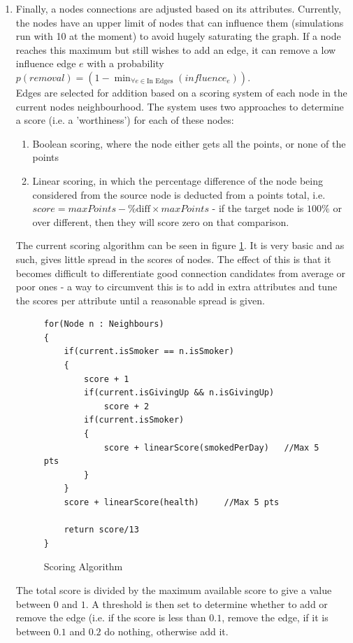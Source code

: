 \documentclass[]{article}
\begin{document}
\begin{enumerate}
\item Finally, a nodes connections are adjusted based on its attributes. Currently, the nodes have an upper limit of nodes that can influence them (simulations run with 10 at the moment) to avoid hugely saturating the graph. If a node reaches this maximum but still wishes to add an edge, it can remove a low influence edge $e$ with a probability $p(removal) = (1 - \operatorname{min}_{\forall e \in \text{In Edges}}(influence_{e}))$.
\\
Edges are selected for addition based on a scoring system of each node in the current nodes neighbourhood. The system uses two approaches to determine a score (i.e. a 'worthiness') for each of these nodes:
\begin{enumerate}
\item Boolean scoring, where the node either gets all the points, or none of the points
\item Linear scoring, in which the percentage difference of the node being considered from the source node is deducted from a points total, i.e. $score = maxPoints - \text{\% diff} \times maxPoints$ - if the target node is $100\%$ or over different, then they will score zero on that comparison.
\end{enumerate}
The current scoring algorithm can be seen in figure \ref{pseudo}. It is very basic and as such, gives little spread in the scores of nodes. The effect of this is that it becomes difficult to differentiate good connection candidates from average or poor ones - a way to circumvent this is to add in extra attributes and tune the scores per attribute until a reasonable spread is given.

\begin{figure}[h]
\begin{center}
	\begin{lstlisting}
for(Node n : Neighbours)
{
	if(current.isSmoker == n.isSmoker)
	{
		score + 1
		if(current.isGivingUp && n.isGivingUp)
			score + 2
		if(current.isSmoker)
		{
			score + linearScore(smokedPerDay) 	//Max 5 pts
		}
	}
	score + linearScore(health)		//Max 5 pts
	
	return score/13
}
	\end{lstlisting}
\end{center}
\label{pseudo}
\caption{Scoring Algorithm}
\end{figure}
The total score is divided by the maximum available score to give a value between $0$ and $1$. A threshold is then set to determine whether to add or remove the edge (i.e. if the score is less than $0.1$, remove the edge, if it is between $0.1$ and $0.2$ do nothing, otherwise add it.

\end{enumerate}
\end{document}
